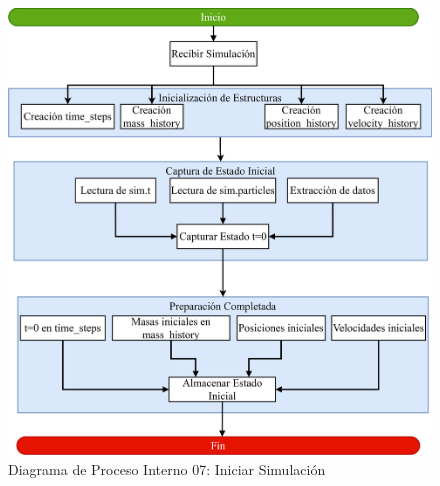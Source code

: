 \begin{figure}[H]
    \centering
    \includegraphics[width=\textwidth]{img/Analisis/DiagramaProcesos/DiagramaProceso07_IniciarSimulacion.png}
    \caption{Diagrama de Proceso Interno 07: Iniciar Simulación}%
    \label{fig:process_diagram07}
\end{figure}

